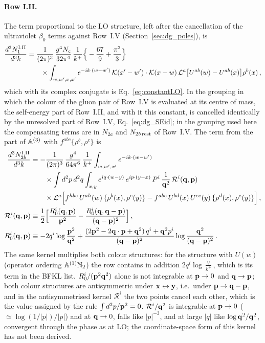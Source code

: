 \paragraph{Row I.II.} The term proportional to the LO structure, left after the cancellation of the ultraviolet $\beta_0$ terms against Row~I.V (Section~\ref{sec:dg_poles}), is
\begin{align}\label{eq:app_IIa}
\frac{d^3N^{\rm I.II}_1}{d^3k}&=\frac{1}{(2\pi)^3}\,\frac{g^4N_c}{32\pi^4}\,\frac{1}{k^+}\Big\{-\frac{67}{9}+\frac{\pi^2}{3}\Big\}\notag\\&\qquad\times\int_{w,w',x,x'}e^{-ik\cdot(w-w')}\,\mathcal{K}(x'-w')\cdot\mathcal{K}(x-w)\,\mathcal L^a\big[U^{ab}(w)-U^{ab}(x)\big]\rho^b(x)\,,
\end{align}
which with its complex conjugate is Eq.~\eqref{eq:constantLO}. In the grouping in which the colour of the gluon pair of Row~I.V is evaluated at its centre of mass, the self-energy part of Row~I.II, and with it this constant, is cancelled identically by the unresolved part of Row~I.V, Eq.~\eqref{eq:dg_SEid}; in the grouping used here the compensating terms are in $N_{2a}$ and $N_{2b\,\rm rest}$ of Row~I.V. The term from the part of $\mathbb{A}^{(3)}$ with $f^{abc}\{\rho^b,\rho^c\}$ is
\begin{align}\label{eq:app_IIb}
\frac{d^3N^{\rm I.II}_{2b}}{d^3k}&=-\frac{1}{(2\pi)^3}\,\frac{g^4}{64\pi^6}\,\frac{1}{k^+}\int_{w,w',x'}e^{-ik\cdot(w-w')}\notag\\&\qquad\times\int d^2p\,d^2q\int_{x,y}e^{iq\cdot(w-y)}\,e^{ip\cdot(y-x)}\,P^i\,\frac{1}{\mathbf{q}^2}\,\mathcal R^i(\mathbf{q},\mathbf{p})\notag\\
&\qquad\times\mathcal L^a\Big[f^{hbc}\,U^{ah}(w)\,\{\rho^b(x),\rho^c(y)\}-f^{abc}\,U^{bd}(x)\,U^{ce}(y)\,\{\rho^d(x),\rho^e(y)\}\Big]\,,\notag\\
\mathcal R^i(\mathbf{q},\mathbf{p})&\equiv\frac12\Big[\frac{R_0^i(\mathbf{q},\mathbf{p})}{\mathbf{p}^2}-\frac{R_0^i(\mathbf{q},\mathbf{q}-\mathbf{p})}{(\mathbf{q}-\mathbf{p})^2}\Big]\,,\notag\\
R_0^i(\mathbf{q},\mathbf{p})&\equiv-2q^i\log\frac{\mathbf{p}^2}{\mathbf{q}^2}+\frac{(2\mathbf{p}^2-2\mathbf{q}\cdot\mathbf{p}+\mathbf{q}^2)\,q^i+\mathbf{q}^2p^i}{(\mathbf{q}-\mathbf{p})^2}\log\frac{\mathbf{q}^2}{(\mathbf{q}-\mathbf{p})^2}\,.
\end{align}
The same kernel multiplies both colour structures: for the structure with $U(w)$ (operator ordering $\mathbb{A}^{(1)}\mathbb{N}_2$) the row contains in addition $2q^i\log\frac{\vee}{k^+}$, which is its term in the BFKL list. $R_0^i/(\mathbf{p}^2\mathbf{q}^2)$ alone is not integrable at $\mathbf{p}\to0$ and $\mathbf{q}\to\mathbf{p}$; both colour structures are antisymmetric under $\mathbf{x}\leftrightarrow\mathbf{y}$, i.e.\ under $\mathbf{p}\to\mathbf{q}-\mathbf{p}$, and in the antisymmetrised kernel $\mathcal R^i$ the two points cancel each other, which is the value assigned by the rule $\int d^2p/\mathbf{p}^2=0$. $\mathcal R^i/\mathbf{q}^2$ is integrable at $\mathbf{p}\to0$ ($\simeq\log(1/|p|)/|p|$) and at $\mathbf{q}\to0$, falls like $|p|^{-3}$, and at large $|q|$ like $\log\mathbf{q}^2/\mathbf{q}^2$, convergent through the phase as at LO; the coordinate-space form of this kernel has not been derived.

